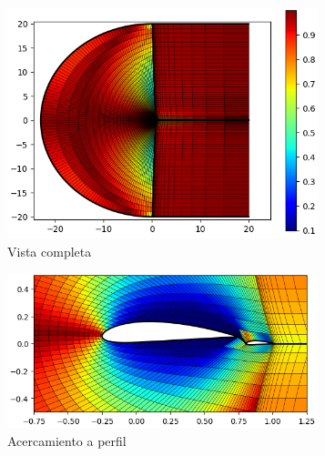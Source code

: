\documentclass[letterpaper, openright, 12pt]{book}
\begin{document}
    \begin{figure}[htbp!]
        \centering
        \begin{subfigure}[c]{0.48\textwidth}
            \includegraphics[keepaspectratio, width=0.99\textwidth]
                {./img/naca4415_c_flap_skew_far}
            \caption{Vista completa}
            \label{fig:naca4415_c_flap_skew_far}
        \end{subfigure}
        \hfill
        \begin{subfigure}[c]{0.48\textwidth}
            \includegraphics[keepaspectratio, width=0.99\textwidth]
                {./img/naca4415_c_flap_skew_close}
            \caption{Acercamiento a perfil}
            \label{fig:naca4415_c_flap_skew_close}
        \end{subfigure}
        \begin{subfigure}[c]{0.48\textwidth}

\end{subfigure}
\end{figure}
\end{document}
